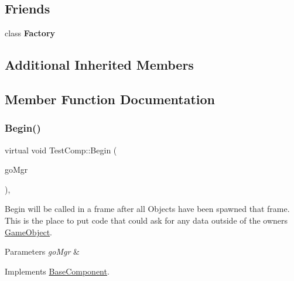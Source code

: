 \subsection*{Friends}
\begin{DoxyCompactItemize}
\item 
\mbox{\label{classTestComp_a328c093d609680cca505905c6d49901a}} 
class {\bfseries Factory}
\end{DoxyCompactItemize}
\subsection*{Additional Inherited Members}


\subsection{Member Function Documentation}
\mbox{\label{classTestComp_a3acda72ee2bf4b9b3e57972fa1a11ca9}} 
\subsubsection{\texorpdfstring{Begin()}{Begin()}}
{\footnotesize\ttfamily virtual void Test\+Comp\+::\+Begin (\begin{DoxyParamCaption}\item[{\hyperlink{classGameObjectManager}{Game\+Object\+Manager} $\ast$}]{go\+Mgr }\end{DoxyParamCaption})\hspace{0.3cm}{\ttfamily [override]}, {\ttfamily [virtual]}}



Begin will be called in a frame after all Objects have been spawned that frame. This is the place to put code that could ask for any data outside of the owner\textquotesingle{}s \hyperlink{classGameObject}{Game\+Object}. 


\begin{DoxyParams}{Parameters}
{\em go\+Mgr} & \\
\hline
\end{DoxyParams}


Implements \hyperlink{classBaseComponent}{Base\+Component}.

\mbox{\label{classTestComp_ab0a4222a9460892b8dddd358d2220c22}} 
